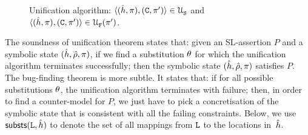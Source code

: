 \begin{figure}[t!]
{\scriptsize
\centering
{}}
\vspace*{-0.6cm}
\caption{Unification algorithm: {\small $\langle (\hat{h}, \pi), (\mathtt{C}, \pi') \rangle \in {\cal U}_{\mathtt{S}}^{}$}
and {\small $\langle (\hat{h}, \pi), (\mathtt{C}, \pi') \rangle \in {\cal U}_{\mathtt{F}}^{}(\pi')$}.\label{unification:algorithm}}
\vspace*{-0.3cm}
\end{figure}

The soundness of unification theorem states that: given an SL-assertion $P$ and a 
symbolic state $(\hat{h}, \hat\rho, \pi)$, if we find a substitution $\theta$ 
for which the unification algorithm terminates successfully; then the symbolic state
$(\hat{h}, \hat\rho, \pi)$ satisfies $P$. 
The bug-finding theorem is more subtle. It states that: if for all possible substitutions 
$\theta$, the unification algorithm terminates with failure; then, in order to find a counter-model 
for $P$, we just have to pick a concretisation of the symbolic state that is consistent with all 
the failing constraints. Below, we use ${\sf substs}(\mathtt{L}, \hat{h})$ to denote 
the set of all mappings from $\mathtt{L}$ to the locations in~$\hat{h}$. 

